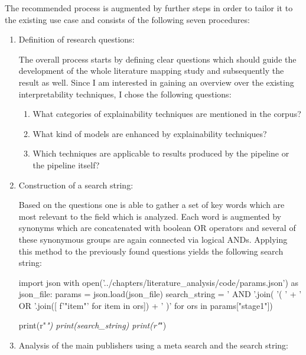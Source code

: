 The recommended process is augmented by further steps in order to tailor it to the existing use case and consists of the following seven procedures:
\begin{enumerate}
	
	\item Definition of research questions:
	
	The overall process starts by defining clear questions which should guide the development of the whole literature mapping study and subsequently the result as well. Since I am interested in gaining an overview over the existing interpretability techniques, I chose the following questions:
	
	\begin{enumerate}
		\item What categories of explainability techniques are mentioned in the corpus?
		\item What kind of models are enhanced by explainability techniques?
		\item Which techniques are applicable to results produced by the pipeline or the pipeline itself?
	\end{enumerate}
	
	\item Construction of a search string:
	
	Based on the questions one is able to gather a set of key words which are most relevant to the field which is analyzed. Each word is augmented by synonyms which are concatenated with boolean OR operators and several of these synonymous groups are again connected via logical ANDs. Applying this method to the previously found questions yields the following search string:
	
\begin{pycode}
import json
with open('../chapters/literature_analysis/code/params.json') as json_file:
	params = json.load(json_file)
	search_string = ' AND '.join( '( ' + ' OR '.join([ f'"{item}"' for item in ors]) + ' )' for ors in params["stage1"])
	
	print(r"\textit{")
	print(search_string)
	print(r"}")
\end{pycode}
	
	
	\item Analysis of the main publishers using a meta search and the search string:
	

\end{enumerate}
